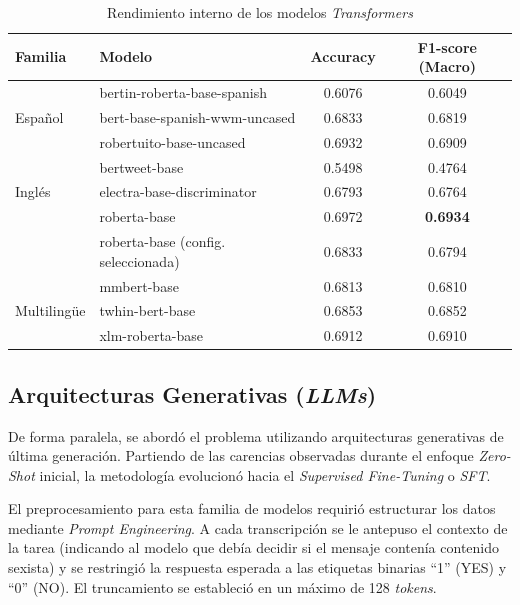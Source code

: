 \begin{table}[H]
    \centering
    \begin{tabular}{llcc}
        \toprule
        \textbf{Familia} & \textbf{Modelo} & \textbf{Accuracy} & \textbf{F1-score (Macro)} \\
        \midrule
        \multirow{3}{*}{Español} 
            & bertin-roberta-base-spanish  & 0.6076 & 0.6049 \\
            & bert-base-spanish-wwm-uncased   & 0.6833 & 0.6819 \\
            & robertuito-base-uncased   & 0.6932 & 0.6909 \\
        \midrule
        \multirow{3}{*}{Inglés} 
            & bertweet-base       & 0.5498 & 0.4764 \\
            & electra-base-discriminator       & 0.6793 & 0.6764 \\
            & roberta-base       & 0.6972 & \textbf{0.6934} \\
            & roberta-base (config. seleccionada) & 0.6833 & 0.6794 \\
        \midrule
        \multirow{3}{*}{Multilingüe} 
            & mmbert-base       & 0.6813 & 0.6810 \\
            & twhin-bert-base       & 0.6853 & 0.6852 \\
            & xlm-roberta-base       & 0.6912 & 0.6910 \\
        \bottomrule
    \end{tabular}
    \caption{Rendimiento interno de los modelos \textit{Transformers}}
    \label{tab:TablaResultadosTransformers}
\end{table}

\subsection{Arquitecturas Generativas (\textit{LLMs})}
\label{subsec:ArquitecturasGenerativasLLMs}
De forma paralela, se abordó el problema utilizando arquitecturas generativas de última generación. Partiendo de las carencias observadas durante el enfoque \textit{Zero-Shot} inicial, la metodología evolucionó hacia el \textit{Supervised Fine-Tuning} o \textit{SFT}. 

El preprocesamiento para esta familia de modelos requirió estructurar los datos mediante \textit{Prompt Engineering}. A cada transcripción se le antepuso el contexto de la tarea (indicando al modelo que debía decidir si el mensaje contenía contenido sexista) y se restringió la respuesta esperada a las etiquetas binarias ``1'' (YES) y ``0'' (NO). El truncamiento se estableció en un máximo de 128 \textit{tokens}.

